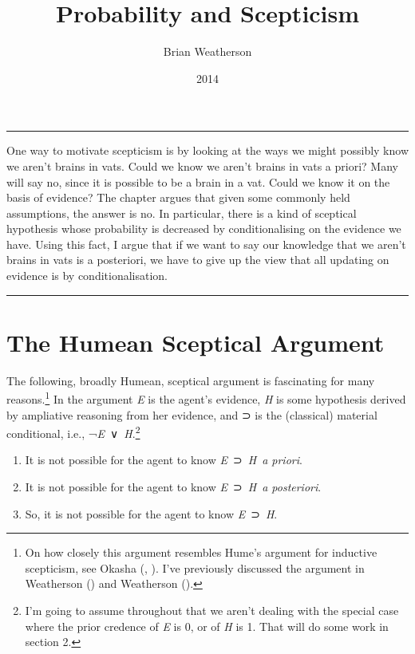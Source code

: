 \documentclass[
  10pt,
  letterpaper,
  DIV=11,
  numbers=noendperiod,
  twoside]{scrartcl}
\title{Probability and Scepticism}
\author{Brian Weatherson}
\date{2014}
\providecommand{\tightlist}{%
  \setlength{\itemsep}{0pt}\setlength{\parskip}{0pt}}\usepackage{longtable,booktabs,array}
\renewenvironment{abstract}
 {\vspace{-1.25cm}
 \quotation\small\noindent\rule{\linewidth}{.5pt}\par\smallskip
 \noindent }
 {\par\noindent\rule{\linewidth}{.5pt}\endquotation}
\begin{document}
\maketitle
\begin{abstract}
One way to motivate scepticism is by looking at the ways we might
possibly know we aren't brains in vats. Could we know we aren't brains
in vats a priori? Many will say no, since it is possible to be a brain
in a vat. Could we know it on the basis of evidence? The chapter argues
that given some commonly held assumptions, the answer is no. In
particular, there is a kind of sceptical hypothesis whose probability is
decreased by conditionalising on the evidence we have. Using this fact,
I argue that if we want to say our knowledge that we aren't brains in
vats is a posteriori, we have to give up the view that all updating on
evidence is by conditionalisation.
\end{abstract}


\section{The Humean Sceptical
Argument}\label{the-humean-sceptical-argument}

The following, broadly Humean, sceptical argument is fascinating for
many reasons.\footnote{On how closely this argument resembles Hume's
  argument for inductive scepticism, see Okasha
  (, ).
  I've previously discussed the argument in Weatherson
  () and Weatherson
  ().} In the argument \emph{E} is
the agent's evidence, \emph{H} is some hypothesis derived by ampliative
reasoning from her evidence, and ⊃ is the (classical) material
conditional, i.e., ¬\emph{E}~∨~\emph{H}.\footnote{I'm going to assume
  throughout that we aren't dealing with the special case where the
  prior credence of \emph{E} is 0, or of \emph{H} is 1. That will do
  some work in section 2.}

\begin{enumerate}
\def\labelenumi{\arabic{enumi}.}
\tightlist
\item
  It is not possible for the agent to know \emph{E}~⊃~\emph{H}~\emph{a
  priori}.
\item
  It is not possible for the agent to know \emph{E}~⊃~\emph{H}~\emph{a
  posteriori}.
\item
  So, it is not possible for the agent to know \emph{E}~⊃~\emph{H}.
\end{enumerate}
\end{document}

